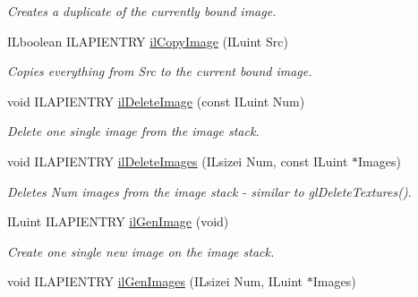 \begin{DoxyCompactItemize}
\begin{DoxyCompactList}\small\item\em Creates a duplicate of the currently bound image. \end{DoxyCompactList}\item 
I\-Lboolean I\-L\-A\-P\-I\-E\-N\-T\-R\-Y \hyperlink{group__image__mgt_gaf0f3ef5b949468a12a4b49e0fb2cb3cb}{il\-Copy\-Image} (I\-Luint Src)
\begin{DoxyCompactList}\small\item\em Copies everything from Src to the current bound image. \end{DoxyCompactList}\item 
\hypertarget{group__image__mgt_ga74c70352949963d2b30c919662a65844}{void I\-L\-A\-P\-I\-E\-N\-T\-R\-Y \hyperlink{group__image__mgt_ga74c70352949963d2b30c919662a65844}{il\-Delete\-Image} (const I\-Luint Num)}\label{group__image__mgt_ga74c70352949963d2b30c919662a65844}

\begin{DoxyCompactList}\small\item\em Delete one single image from the image stack. \end{DoxyCompactList}\item 
\hypertarget{group__image__mgt_gab4346d371243537a7050e255f99c8b16}{void I\-L\-A\-P\-I\-E\-N\-T\-R\-Y \hyperlink{group__image__mgt_gab4346d371243537a7050e255f99c8b16}{il\-Delete\-Images} (I\-Lsizei Num, const I\-Luint $\ast$Images)}\label{group__image__mgt_gab4346d371243537a7050e255f99c8b16}

\begin{DoxyCompactList}\small\item\em Deletes Num images from the image stack -\/ similar to gl\-Delete\-Textures(). \end{DoxyCompactList}\item 
\hypertarget{group__image__mgt_ga056ebbb4dc5b18e027c555fcf39bd3c4}{I\-Luint I\-L\-A\-P\-I\-E\-N\-T\-R\-Y \hyperlink{group__image__mgt_ga056ebbb4dc5b18e027c555fcf39bd3c4}{il\-Gen\-Image} (void)}\label{group__image__mgt_ga056ebbb4dc5b18e027c555fcf39bd3c4}

\begin{DoxyCompactList}\small\item\em Create one single new image on the image stack. \end{DoxyCompactList}\item 
\hypertarget{group__image__mgt_ga2bd61fd22ff429363d44a4eaff3b064d}{void I\-L\-A\-P\-I\-E\-N\-T\-R\-Y \hyperlink{group__image__mgt_ga2bd61fd22ff429363d44a4eaff3b064d}{il\-Gen\-Images} (I\-Lsizei Num, I\-Luint $\ast$Images)}\label{group__image__mgt_ga2bd61fd22ff429363d44a4eaff3b064d}


\end{DoxyCompactItemize}
